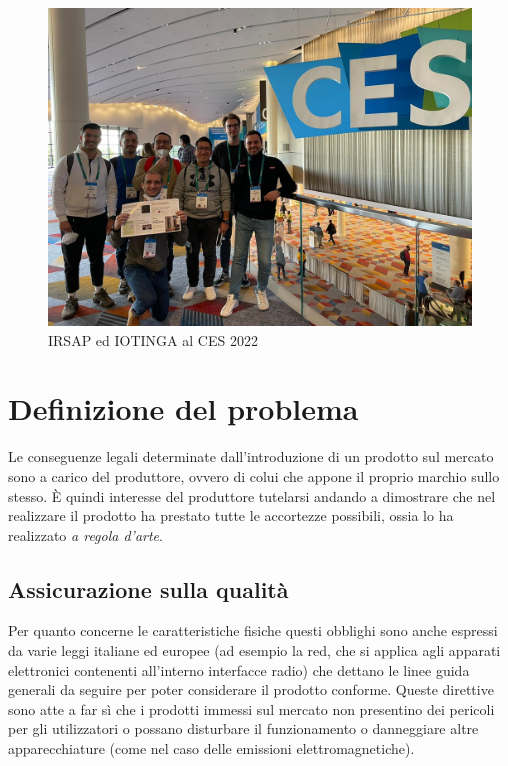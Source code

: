\documentclass[12pt,a4paper,twoside,titlepage]{book}
\begin{document}
\begin{figure}[ht]
    \centering
    \includegraphics[width=12cm]{img/ces.jpeg}
    \caption{IRSAP ed IOTINGA al CES 2022}
    \label{fig:ces}
\end{figure}

\chapter{Definizione del problema}

Le conseguenze legali determinate dall'introduzione di un prodotto sul mercato 
sono a carico del produttore, ovvero di colui che appone il proprio marchio sullo stesso. 
È quindi interesse del produttore tutelarsi andando a dimostrare che nel realizzare il 
prodotto ha prestato tutte le accortezze possibili, ossia lo ha realizzato \textit{a regola d'arte}. 

\section{Assicurazione sulla qualità}

Per quanto concerne le caratteristiche fisiche questi obblighi sono 
anche espressi da varie leggi italiane ed europee (ad esempio la \acrshort{red}, 
che si applica agli apparati elettronici contenenti all'interno interfacce radio) 
che dettano le linee guida generali da seguire per poter considerare il prodotto 
conforme. Queste direttive sono atte a far sì che i prodotti immessi sul mercato non 
presentino dei pericoli per gli utilizzatori o possano disturbare il funzionamento o 
danneggiare altre apparecchiature (come nel caso delle emissioni elettromagnetiche). 
\end{document}
